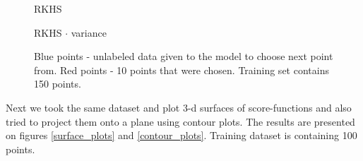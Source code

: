\documentclass[a4paper]{article}
\begin{document}
\begin{figure}[h]
\begin{minipage}[h]{0.49\linewidth}
\end{minipage}
\hfill
\begin{minipage}[h]{0.49\linewidth}
 RKHS
\end{minipage}
\vfill
\begin{minipage}[h]{0.49\linewidth}
 RKHS $\cdot$ variance
\end{minipage}
\caption{Blue points - unlabeled data given to the model to choose next point from. Red points - 10 points that were chosen. Training set contains 150 points.}
\label{recent3}
\end{figure}

\clearpage
Next we took the same dataset and plot 3-d surfaces of score-functions and also tried to project them onto a plane using contour plots. The results are presented on figures \ref{surface_plots} and \ref{contour_plots}. Training dataset is containing 100 points.
\end{document}
